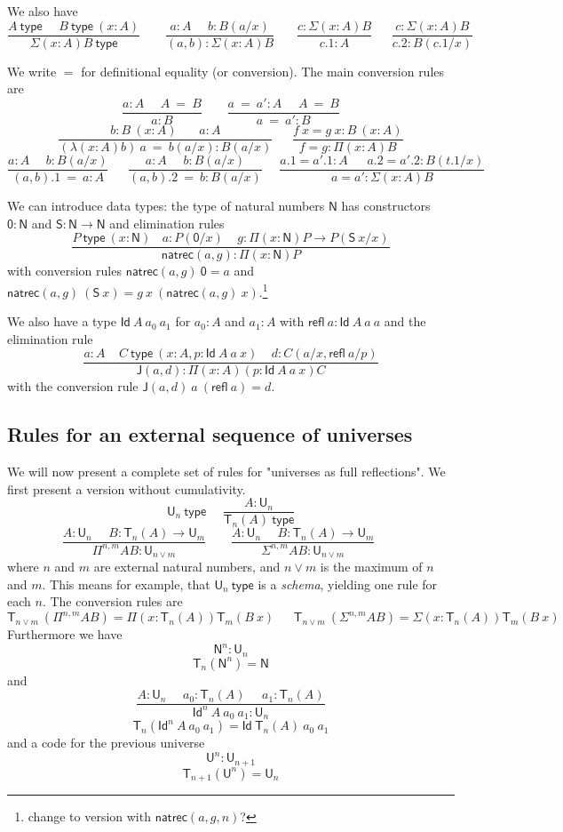 \documentclass[11pt,a4paper]{article}
\newcommand{\refl}{\mathsf{refl}}
\newcommand{\Id}{\mathsf{Id}}
\newcommand{\conv}{=}
\def\NN{\mathsf{N}}
\def\UU{\mathsf{U}}
\def\JJ{\mathsf{J}}
\def\ZERO{\mathsf{0}}
\def\SUCC{\mathsf{S}}
\newcommand{\type}{\mathsf{type}}
\newcommand{\T}{\mathsf{T}}
\newcommand{\natrec}{\mathsf{natrec}}
\begin{document}
We also have
$$
\frac{A~\type~~~~~~B~\type~(x:A)}{\Sigma (x:A) B~\type}~~~~~~~~~
\frac{a:A~~~~~~b:B(a/x)}{(a,b):\Sigma (x:A) B}~~~~~~~~
\frac{c:\Sigma (x:A) B}{c.1:A}~~~~~~~
\frac{c:\Sigma (x:A) B}{c.2:B(c.1/x)}
$$

We write $\conv$ for definitional equality (or conversion). The main conversion rules are
$$
\frac{ a:A~~~~~~ A~ \conv~ B}{ a:B}~~~~~~~~~
\frac{ a ~\conv~a':A~~~~~~ A  ~\conv~ B}{ a ~\conv~a':B}
$$
$$
\frac{b:B~(x:A)~~~~~~~~ a:A}{ (\lambda (x:A)b)~a  ~\conv~ b(a/x):B(a/x)}
~~~~~~~
\frac{f~x = g~x:B~(x:A)}{ f = g : \Pi (x:A)B}
$$
$$
\frac{ a:A~~~~~~ b:B(a/x)}{ (a,b).1  ~\conv~ a:A}
~~~~~~~
\frac{ a:A~~~~~~ b:B(a/x)}{ (a,b).2  ~\conv~ b:B(a/x)}~~~~~~
\frac{ a.1 = a'.1:A~~~~~~~ a.2 = a'.2:B(t.1/x)}{ a = a' : \Sigma (x:A)B}
$$

We can introduce data types: the type of natural numbers $\NN$ has
constructors $\ZERO:\NN$ and $\SUCC:\NN\rightarrow\NN$ and elimination rules
$$
\frac{P~\type~(x:\NN)~~~~a:P(\ZERO/x)~~~~~g:\Pi (x:\NN)P\rightarrow P(\SUCC~x/x)}{\natrec(a,g):\Pi (x:\NN)P}
$$
with conversion rules $\natrec(a,g)~\ZERO = a$ and $\natrec(a,g)~(\SUCC~x) = g~x~(\natrec(a,g)~x)$.\footnote{change to version with $\natrec(a,g,n)$?}

We also have a type $\Id~A~a_0~a_1$ for $a_0:A$ and $a_1:A$ with $\refl~a:\Id~A~a~a$
and the elimination rule
$$\frac{a:A~~~~~C~\type~(x:A,p:\Id~A~a~x)~~~~~d:C(a/x,\refl~a/p)}{\JJ (a,d):\Pi (x:A)(p:\Id~A~a~x)C}$$
with the conversion rule $\JJ(a,d)~a~(\refl~a) = d$.

\subsection*{Rules for an external sequence of universes}

We will now present a complete set of rules for "universes as full reflections". We first present a version without cumulativity.
$$
\UU_n~\type~~~~~~
\frac{A:\UU_{n}}{\T_{n}(A)~\type}
$$
$$
\frac{A:\UU_{n}~~~~~~B:\T_{n}(A)\rightarrow \UU_{m}}
     {\Pi^{n,m} A B:\UU_{n\vee m}}~~~~~~~~~
\frac{A:\UU_{n}~~~~~~B:\T_{n}(A)\rightarrow \UU_{m}}
     {\Sigma^{n,m} A B:\UU_{n\vee m}}~~~~~~~~~
$$
where $n$ and $m$ are external natural numbers, and $n \vee m$ is the maximum of $n$ and $m$. This means for example, that $\UU_n~\type$ is a {\em schema}, yielding one rule for each $n$.
The conversion rules are
$$
\T_{n\vee m}~(\Pi^{n,m} A B) = \Pi (x:\T_{n}(A)) \T_{m}(B~x)~~~~~~~
\T_{n\vee m}~(\Sigma^{n,m} A B) = \Sigma (x:\T_{n}(A)) \T_{m}(B~x)~~~~~~~
$$
Furthermore we have $$\NN^{n}:\UU_{n}$$
$$\T_{n}(\NN^{n}) = \NN$$
and
$$
\frac{A:\UU_n~~~~~~a_0:\T_n(A)~~~~~~a_1:\T_n(A)}
{\Id^n~A~a_0~a_1:\UU_n}
$$
$$\T_n(\Id^n~A~a_0~a_1) = \Id~\T_n(A)~a_0~a_1$$
and a code for the previous universe
$${\UU^{n}}:\UU_{n + 1}$$
$$\T_{n + 1}({\UU^{n}}) = \UU_{n}$$
\end{document}
